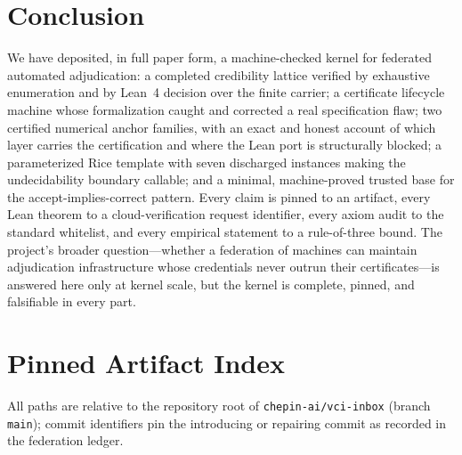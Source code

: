 \documentclass[11pt]{article}
\theoremstyle{definition}
\theoremstyle{remark}
\begin{document}
\section{Conclusion}\label{sec:conclusion}

We have deposited, in full paper form, a machine-checked kernel for
federated automated adjudication: a completed credibility lattice verified
by exhaustive enumeration and by Lean~4 decision over the finite carrier; a
certificate lifecycle machine whose formalization caught and corrected a real
specification flaw; two certified numerical anchor families, with an exact
and honest account of which layer carries the certification and where the
Lean port is structurally blocked; a parameterized Rice template with seven
discharged instances making the undecidability boundary callable; and a
minimal, machine-proved trusted base for the accept-implies-correct pattern.
Every claim is pinned to an artifact, every Lean theorem to a
cloud-verification request identifier, every axiom audit to the standard
whitelist, and every empirical statement to a rule-of-three bound. The
project's broader question---whether a federation of machines can maintain
adjudication infrastructure whose credentials never outrun their
certificates---is answered here only at kernel scale, but the kernel is
complete, pinned, and falsifiable in every part.

\appendix

\section{Pinned Artifact Index}\label{app:anchors}

All paths are relative to the repository root of \texttt{chepin-ai/vci-inbox}
(branch \texttt{main}); commit identifiers pin the introducing or repairing
commit as recorded in the federation ledger.
\end{document}
